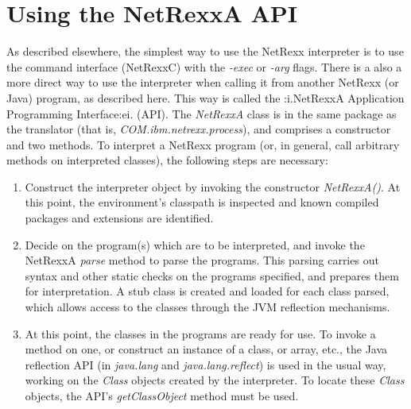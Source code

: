 \chapter{Using the NetRexxA API}
As described elsewhere, the simplest way to use the NetRexx interpreter
is to use the command interface (NetRexxC) with the \emph{-exec}
or \emph{-arg} flags.
There is a also a more direct way to use the interpreter when calling it
from another NetRexx (or Java) program, as described here.  This
way is called the :i.NetRexxA Application Programming Interface:ei.
(API).
\newline
The \emph{NetRexxA} class is in the same package as the translator
(that is, \emph{COM.ibm.netrexx.process}), and comprises a constructor
and two methods.  To interpret a NetRexx program (or, in general, call
arbitrary methods on interpreted classes), the following steps are
necessary:
\begin{enumerate}
\item Construct the interpreter object by invoking the constructor \emph{NetRexxA()}.
At this point, the environment's classpath is inspected and known
compiled packages and extensions are identified.
\item Decide on the program(s) which are to be interpreted, and invoke the
NetRexxA \emph{parse} method to parse the programs.  This parsing
carries out syntax and other static checks on the programs specified,
and prepares them for interpretation.  A stub class is created
and loaded for each class parsed, which allows access to the classes
through the JVM reflection mechanisms.
\item At this point, the classes in the programs are ready for use.  To invoke
a method on one, or construct an instance of a class, or array, etc.,
the Java reflection API (in \emph{java.lang} and \emph{java.lang.reflect})
is used in the usual way, working on the \emph{Class} objects created by
the interpreter.  To locate these \emph{Class} objects, the
API's \emph{getClassObject} method must be used.
\end{enumerate}

